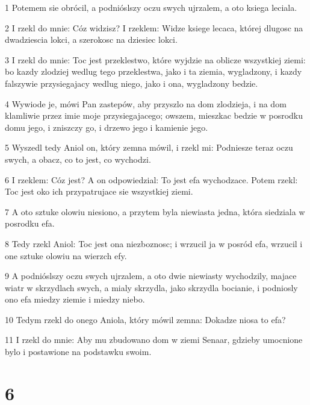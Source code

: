 \par 1 Potemem sie obrócil, a podnióslszy oczu swych ujrzalem, a oto ksiega leciala.
\par 2 I rzekl do mnie: Cóz widzisz? I rzeklem: Widze ksiege lecaca, której dlugosc na dwadziescia lokci, a szerokosc na dziesiec lokci.
\par 3 I rzekl do mnie: Toc jest przeklestwo, które wyjdzie na oblicze wszystkiej ziemi: bo kazdy zlodziej wedlug tego przeklestwa, jako i ta ziemia, wygladzony, i kazdy falszywie przysiegajacy wedlug niego, jako i ona, wygladzony bedzie.
\par 4 Wywiode je, mówi Pan zastepów, aby przyszlo na dom zlodzieja, i na dom klamliwie przez imie moje przysiegajacego; owszem, mieszkac bedzie w posrodku domu jego, i zniszczy go, i drzewo jego i kamienie jego.
\par 5 Wyszedl tedy Aniol on, który zemna mówil, i rzekl mi: Podniesze teraz oczu swych, a obacz, co to jest, co wychodzi.
\par 6 I rzeklem: Cóz jest? A on odpowiedzial: To jest efa wychodzace. Potem rzekl: Toc jest oko ich przypatrujace sie wszystkiej ziemi.
\par 7 A oto sztuke olowiu niesiono, a przytem byla niewiasta jedna, która siedziala w posrodku efa.
\par 8 Tedy rzekl Aniol: Toc jest ona niezboznosc; i wrzucil ja w posród efa, wrzucil i one sztuke olowiu na wierzch efy.
\par 9 A podnióslszy oczu swych ujrzalem, a oto dwie niewiasty wychodzily, majace wiatr w skrzydlach swych, a mialy skrzydla, jako skrzydla bocianie, i podniosly ono efa miedzy ziemie i miedzy niebo.
\par 10 Tedym rzekl do onego Aniola, który mówil zemna: Dokadze niosa to efa?
\par 11 I rzekl do mnie: Aby mu zbudowano dom w ziemi Senaar, gdzieby umocnione bylo i postawione na podstawku swoim.

\chapter{6}

